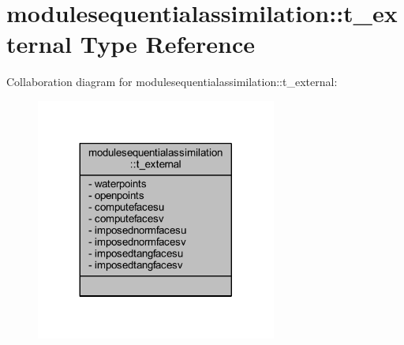 \hypertarget{structmodulesequentialassimilation_1_1t__external}{}\section{modulesequentialassimilation\+:\+:t\+\_\+external Type Reference}
\label{structmodulesequentialassimilation_1_1t__external}


Collaboration diagram for modulesequentialassimilation\+:\+:t\+\_\+external\+:\nopagebreak
\begin{figure}[H]
\begin{center}
\leavevmode
\includegraphics[width=224pt]{structmodulesequentialassimilation_1_1t__external__coll__graph}
\end{center}
\end{figure}

